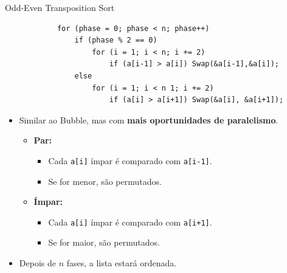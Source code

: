 	\begin{frame}[fragile]{Odd-Even Transposition Sort }
		\begin{verbatim}
			for (phase = 0; phase < n; phase++) 
				if (phase % 2 == 0)
					for (i = 1; i < n; i += 2)
						if (a[i-1] > a[i]) Swap(&a[i-1],&a[i]); 
				else
					for (i = 1; i < n 1; i += 2)
						if (a[i] > a[i+1]) Swap(&a[i], &a[i+1]);
		\end{verbatim}
				\pause
		\begin{itemize}
			\item Similar ao Bubble, mas com \textbf{mais oportunidades de paralelismo}.
			\setlength\itemsep{0.3em}
			\begin{itemize}
				\setlength\itemsep{0.2em}
				\item \textbf{Par:} 
				\begin{itemize}
					\item Cada {\tt a[i]} ímpar é comparado com {\tt a[i-1]}. 
					\item Se for menor, são permutados.
				\end{itemize}
				\item \textbf{Ímpar:} 
				\begin{itemize}
					\item Cada {\tt a[i]} ímpar é comparado com {\tt a[i+1]}. 
					\item Se for maior, são permutados.
				\end{itemize}
			\end{itemize}
			\item Depois de $n$ fases, a lista estará ordenada.
		\end{itemize}
\end{frame}

